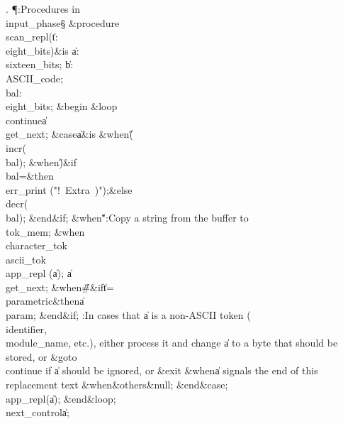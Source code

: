 . \P\?:Procedures in \\{input\_phase}\X\mathrel{+}\S\?\6
\&{procedure}\8\1\\{scan\_repl}\?(\1\?\|t\?:\?\\{eight\_bits}\?\2)\?\2\8\&{is}%
\8\1\6
\|a\?:\?\\{sixteen\_bits};\6
\|b\?:\?\\{ASCII\_code};\6
\\{bal}\?:\?\\{eight\_bits}\?\K{};%
\6
\4\&{begin}\6
\1\&{loop}\6
\4\BL\\{continue}\EL\8\|a\?\K\?\\{get\_next};\6
\&{case}\1\8\|a\1\8\&{is}\8\6
\4\&{when}\8\H{(}\KR\8\\{incr}\?\1(\?\\{bal}\?\2)\?;\6
\4\&{when}\8\H{)}\KR\8\&{if}\1\1\8\\{bal}\?=\2\8\&{then}\8\\{err\_print}\?%
\1(\?\.{"!\ Extra\ )"}\?\2)\?;\8\&{else}\8\\{decr}\?\1(\?\\{bal}\?\2)\?;\2\6
\&{end}\8\2\&{if}\1;\6
\4\&{when}\8\H{"}\KR\8:Copy a string from the buffer to \\{tok\_mem}\X;\6
\4\&{when}\8\\{character\_tok}\?\mathrel{\.|}\?\\{ascii\_tok}\KR\8\\{app\_repl}%
\?\1(\?\|a\?\2)\?;\5
\|a\?\K\?\\{get\_next};\6
\4\&{when}\8\H{\#}\KR\8\&{if}\1\1\8\|t\?=\?\\{parametric}\2\8\&{then}\8\|a\?\K%
\?\\{param};\2\6
\&{end}\8\2\&{if}\1;\6
\hbox{\4}:In cases that \|a is a non-ASCII token (\\{identifier}, %
\\{module\_name}, etc.), either process it and change \|a to a byte that should
be stored, or \&{goto}\8\\{continue} if \|a should be ignored, or \?\&{exit}\8%
\&{when}\?\8\|a signals the end of this replacement text\X\6
\4\&{when}\8\&{others}\8\KR\8\&{null};\2\6
\4\2\&{end}\8\&{case};\6
\\{app\_repl}\?\1(\?\|a\?\2)\?;\2\6
\&{end}\8\&{loop};\6
\\{next\_control}\?\K\?\|a;\6

